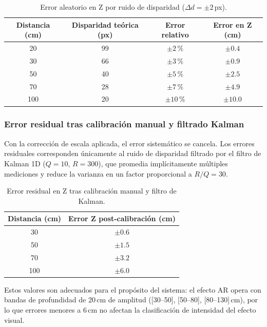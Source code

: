 \begin{table}[H]
\centering
\caption{Error aleatorio en Z por ruido de disparidad ($\Delta d = \pm 2$\,px).}
\label{tab:error_aleatorio}
\begin{tabular}{cccc}
\hline
\textbf{Distancia (cm)} & \textbf{Disparidad teórica (px)} & \textbf{Error relativo} & \textbf{Error en Z (cm)} \\
\hline
20  & 99 & $\pm 2\,\%$  & $\pm 0.4$ \\
30  & 66 & $\pm 3\,\%$  & $\pm 0.9$ \\
50  & 40 & $\pm 5\,\%$  & $\pm 2.5$ \\
70  & 28 & $\pm 7\,\%$  & $\pm 4.9$ \\
100 & 20 & $\pm 10\,\%$ & $\pm 10.0$ \\
\hline
\end{tabular}
\end{table}

\subsubsection{Error residual tras calibración manual y filtrado Kalman}

Con la corrección de escala aplicada, el error sistemático se cancela. Los errores residuales corresponden únicamente al ruido de disparidad filtrado por el filtro de Kalman 1D ($Q=10$, $R=300$), que promedia implícitamente múltiples mediciones y reduce la varianza en un factor proporcional a $R/Q = 30$.

\begin{table}[H]
\centering
\caption{Error residual en Z tras calibración manual y filtro de Kalman.}
\label{tab:error_postcalibracion}
\begin{tabular}{cc}
\hline
\textbf{Distancia (cm)} & \textbf{Error Z post-calibración (cm)} \\
\hline
30  & $\pm 0.6$ \\
50  & $\pm 1.5$ \\
70  & $\pm 3.2$ \\
100 & $\pm 6.0$ \\
\hline
\end{tabular}
\end{table}

Estos valores son adecuados para el propósito del sistema: el efecto AR opera con bandas de profundidad de 20\,cm de amplitud ([30–50], [50–80], [80–130]\,cm), por lo que errores menores a 6\,cm no afectan la clasificación de intensidad del efecto visual.

